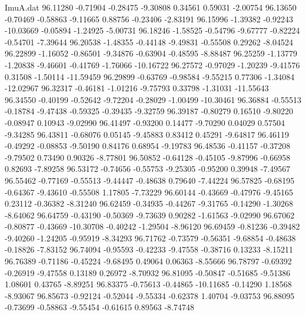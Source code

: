 \begin{filecontents}{ImuA.dat}
  96.11280   -0.71904   -0.28475   -9.30808    0.34561    0.59031   -2.00754
  96.13650   -0.70469   -0.58863   -9.11665    0.88756   -0.23406   -2.83191
  96.15996   -1.39382   -0.92243  -10.03669   -0.05894   -1.24925   -5.00731
  96.18246   -1.58525   -0.54796   -9.67777   -0.82224   -0.54701   -7.39644
  96.20538   -1.48355   -0.44148   -9.49831   -0.55508    0.29262   -8.04524
  96.22899   -1.16052   -0.86501   -9.34876   -0.63904   -0.48595   -8.88487
  96.25259   -1.13779   -1.20838   -9.46601   -0.41769   -1.76066  -10.16722
  96.27572   -0.97029   -1.20239   -9.41576    0.31508   -1.50114  -11.59459
  96.29899   -0.63769   -0.98584   -9.55215    0.77306   -1.34084  -12.02967
  96.32317   -0.46181   -1.01216   -9.75793    0.33798   -1.31031  -11.55643
  96.34550   -0.40199   -0.52642   -9.72204   -0.28029   -1.00499  -10.30461
  96.36884   -0.55513   -0.18784   -9.47438   -0.59325   -0.39435   -9.32759
  96.39187   -0.80279    0.16510   -9.80220   -0.08947    0.10943   -9.02990
  96.41497   -0.93200    0.14477   -9.70290    0.04029    0.57504   -9.34285
  96.43811   -0.68076    0.05145   -9.45883    0.83412    0.45291   -9.64817
  96.46119   -0.49292   -0.08853   -9.50190    0.84176    0.68954   -9.19783
  96.48536   -0.41157   -0.37208   -9.79502    0.73490    0.90326   -8.77801
  96.50852   -0.64128   -0.45105   -9.87996   -0.66958    0.82693   -7.89258
  96.53172   -0.74656   -0.55753   -9.25305   -0.95200    0.39948   -7.49567
  96.55462   -0.77169   -0.55513   -9.44447   -0.48638    0.79640   -7.44224
  96.57825   -0.68195   -0.64367   -9.43610   -0.55508    1.17805   -7.73229
  96.60144   -0.43669   -0.47976   -9.45165    0.23112   -0.36382   -8.31240
  96.62459   -0.34935   -0.44267   -9.31765   -0.14290   -1.30268   -8.64062
  96.64759   -0.43190   -0.50369   -9.73639    0.90282   -1.61563   -9.02990
  96.67062   -0.80877   -0.43669  -10.30708   -0.40242   -1.29504   -8.96120
  96.69459   -0.81236   -0.39482   -9.40260   -1.24205   -0.95919   -8.34293
  96.71762   -0.73579   -0.56351   -9.68854   -0.48638   -0.18826   -7.83152
  96.74094   -0.95593   -0.42233   -9.47558   -0.38716    0.13233   -8.15211
  96.76389   -0.71186   -0.45224   -9.68495    0.49064    0.06363   -8.55666
  96.78797   -0.69392   -0.26919   -9.47558    0.13189    0.26972   -8.70932
  96.81095   -0.50847   -0.51685   -9.51386    1.08601    0.43765   -8.89251
  96.83375   -0.75613   -0.44865  -10.11685   -0.14290    1.18568   -8.93067
  96.85673   -0.92124   -0.52044   -9.55334   -0.62378    1.40704   -9.03753
  96.88095   -0.73699   -0.58863   -9.55454   -0.61615    0.89563   -8.74748

\end{filecontents}
